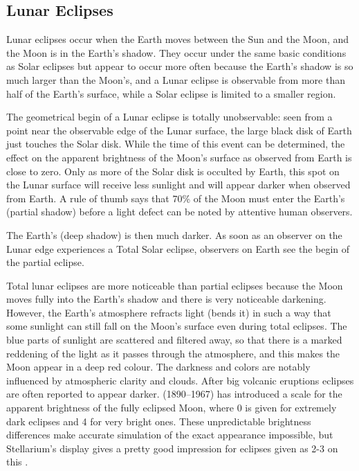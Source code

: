 \subsection{Lunar Eclipses}
\label{sec:Eclipses:lunar}

Lunar eclipses occur when the Earth moves between the Sun and the Moon,
and the Moon is in the Earth's shadow. They occur under the same basic
conditions as Solar eclipses but appear to occur more often because the
Earth's shadow is so much larger than the Moon's, and a Lunar eclipse is
observable from more than half of the Earth's surface, while a Solar eclipse
is limited to a smaller region.

The geometrical begin of a Lunar eclipse is totally unobservable: seen
from a point near the observable edge of the Lunar surface, the large black
disk of Earth just touches the Solar disk. While the time of this
event can be determined, the effect on the apparent brightness of the
Moon's surface as observed from Earth is close to zero. Only as more
of the Solar disk is occulted by Earth, this spot on the Lunar surface
will receive less sunlight and will appear darker when observed from
Earth. A rule of thumb says that 70\% of the Moon must enter the
Earth's  (partial shadow) before a light defect can be noted by attentive human
observers. 

The Earth's  (deep shadow) is then much darker. As soon as an observer on
the Lunar edge experiences a Total Solar eclipse, observers on Earth
see the begin of the partial eclipse.

Total lunar eclipses are more noticeable than partial eclipses because
the Moon moves fully into the Earth's shadow and there is very
noticeable darkening. However, the Earth's atmosphere refracts light
(bends it) in such a way that some sunlight can still fall on the Moon's
surface even during total eclipses. The blue parts of sunlight are scattered and filtered away, 
so that there is a marked reddening of the light as it passes through the atmosphere, and this 
makes the Moon appear in a deep red colour. The darkness and colors are notably influenced by 
atmospheric clarity and clouds. After big volcanic eruptions eclipses are often reported to appear darker.
 (1890--1967) has introduced a scale for the apparent brightness of the 
fully eclipsed Moon, where 0 is given for extremely dark eclipses and 4 for very bright ones. 
These unpredictable brightness differences make accurate simulation of the exact appearance impossible, 
but Stellarium's display gives a pretty good impression for eclipses given as 2-3 on this . 

